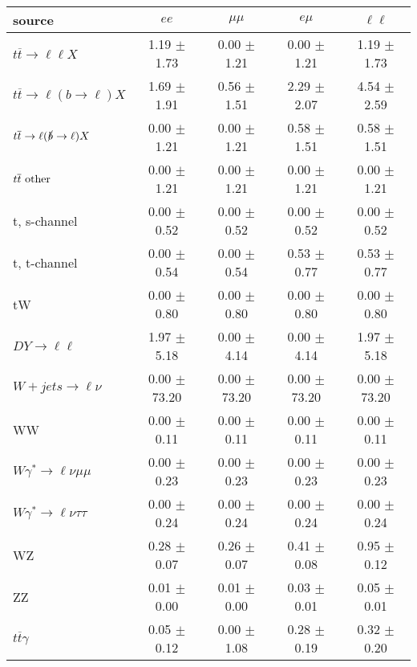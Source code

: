 \begin{tabular}{l|cccc} \hline\hline
source & $ee$ & $\mu\mu$ & $e\mu$ & $\ell\ell $ \\
\hline
$t\overline{t} \rightarrow \ell \ell X$ &  1.19 $\pm$  1.73 &  0.00 $\pm$  1.21 &  0.00 $\pm$  1.21 &  1.19 $\pm$  1.73 \\
$t\overline{t} \rightarrow \ell (b \rightarrow \ell) X$ &  1.69 $\pm$  1.91 &  0.56 $\pm$  1.51 &  2.29 $\pm$  2.07 &  4.54 $\pm$  2.59 \\
$t\overline{t} \rightarrow \ell (\slashed b \rightarrow \ell) X$ &  0.00 $\pm$  1.21 &  0.00 $\pm$  1.21 &  0.58 $\pm$  1.51 &  0.58 $\pm$  1.51 \\
        $t\overline{t}\ \rm{other}$ &  0.00 $\pm$  1.21 &  0.00 $\pm$  1.21 &  0.00 $\pm$  1.21 &  0.00 $\pm$  1.21 \\
\hline
                       t, s-channel &  0.00 $\pm$  0.52 &  0.00 $\pm$  0.52 &  0.00 $\pm$  0.52 &  0.00 $\pm$  0.52 \\
                       t, t-channel &  0.00 $\pm$  0.54 &  0.00 $\pm$  0.54 &  0.53 $\pm$  0.77 &  0.53 $\pm$  0.77 \\
                                 tW &  0.00 $\pm$  0.80 &  0.00 $\pm$  0.80 &  0.00 $\pm$  0.80 &  0.00 $\pm$  0.80 \\
\hline
         $DY \rightarrow \ell \ell$ &  1.97 $\pm$  5.18 &  0.00 $\pm$  4.14 &  0.00 $\pm$  4.14 &  1.97 $\pm$  5.18 \\
      $W+jets \rightarrow \ell \nu$ &  0.00 $\pm$ 73.20 &  0.00 $\pm$ 73.20 &  0.00 $\pm$ 73.20 &  0.00 $\pm$ 73.20 \\
                                 WW &  0.00 $\pm$  0.11 &  0.00 $\pm$  0.11 &  0.00 $\pm$  0.11 &  0.00 $\pm$  0.11 \\
\hline
$W\gamma^{*} \rightarrow \ell \nu \mu\mu$ &  0.00 $\pm$  0.23 &  0.00 $\pm$  0.23 &  0.00 $\pm$  0.23 &  0.00 $\pm$  0.23 \\
$W\gamma^{*} \rightarrow \ell \nu \tau\tau$ &  0.00 $\pm$  0.24 &  0.00 $\pm$  0.24 &  0.00 $\pm$  0.24 &  0.00 $\pm$  0.24 \\
                                 WZ &  0.28 $\pm$  0.07 &  0.26 $\pm$  0.07 &  0.41 $\pm$  0.08 &  0.95 $\pm$  0.12 \\
                                 ZZ &  0.01 $\pm$  0.00 &  0.01 $\pm$  0.00 &  0.03 $\pm$  0.01 &  0.05 $\pm$  0.01 \\
\hline
              $t\overline{t}\gamma$ &  0.05 $\pm$  0.12 &  0.00 $\pm$  1.08 &  0.28 $\pm$  0.19 &  0.32 $\pm$  0.20 \\

\end{tabular}
